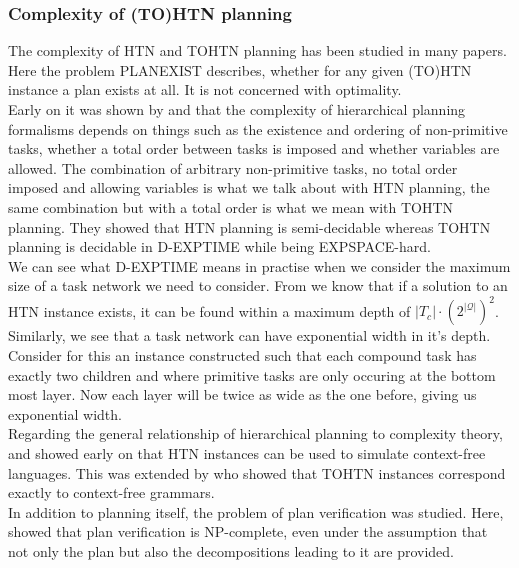 \subsubsection{Complexity of (TO)HTN planning}
\label{prelim: tohtn complexity}
The complexity of HTN and TOHTN planning has been studied in many papers. Here the problem PLANEXIST describes, whether for any given (TO)HTN instance a plan exists at all. It is not concerned with optimality. \\
Early on it was shown by \cite{erol1994htn} and \cite{erol1996complexity} that the complexity of hierarchical planning formalisms depends on things such as the existence and ordering of non-primitive tasks, whether a total order between tasks is imposed and whether variables are allowed. The combination of arbitrary non-primitive tasks, no total order imposed and allowing variables is what we talk about with HTN planning, the same combination but with a total order is what we mean with TOHTN planning. They showed that HTN planning is semi-decidable whereas TOHTN planning is decidable in D-EXPTIME while being EXPSPACE-hard. \\
We can see what D-EXPTIME means in practise when we consider the maximum size of a task network we need to consider. From \cite{behnke2018totsat} we know that if a solution to an HTN instance exists, it can be found within a maximum depth of $|T_c| \cdot(2 ^{|\mathcal{Q}|})^2$. Similarly, we see that a task network can have exponential width in it's depth. Consider for this an instance constructed such that each compound task has exactly two children and where primitive tasks are only occuring at the bottom most layer. Now each layer will be twice as wide as the one before, giving us exponential width. \\
Regarding the general relationship of hierarchical planning to complexity theory, \cite{erol1994htn} and \cite{erol1996complexity} showed early on that HTN instances can be used to simulate context-free languages. This was extended by \cite{holler2014language} who showed that TOHTN instances correspond exactly to context-free grammars. \\
In addition to planning itself, the problem of plan verification was studied. Here, \cite{behnke2015complexity} showed that plan verification is NP-complete, even under the assumption that not only the plan but also the decompositions leading to it are provided.
